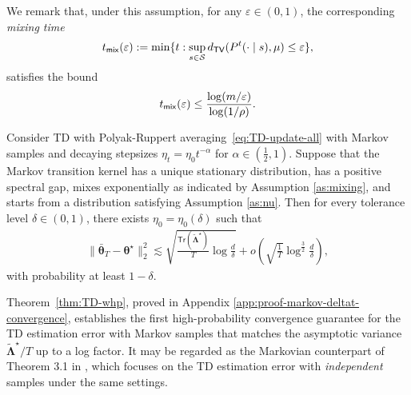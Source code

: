 \medskip
We remark that, under this assumption, for any $\varepsilon \in (0,1)$, the corresponding \emph{mixing time} 
\begin{align}\label{eq:defn-tmix}
t_{\mathsf{mix}}(\varepsilon):= \min\{t:\sup_{s \in \mathcal{S}}d_{\mathsf{TV}}(P^t(\cdot \mid s),\mu) \leq \varepsilon\},
\end{align}
satisfies the bound
\begin{align}\label{eq:tmix-bound}
t_{\mathsf{mix}}(\varepsilon) \leq \frac{ \log (m/\varepsilon)}{\log (1/\rho)}.
\end{align}

\medskip
\begin{customtheorem}\label{thm:TD-whp}
Consider TD with Polyak-Ruppert averaging~\eqref{eq:TD-update-all} with Markov samples and decaying stepsizes $\eta_t = \eta_0 t^{-\alpha}$ for $\alpha \in (\frac{1}{2},1)$. %
Suppose that the Markov transition kernel has a unique stationary distribution, has a positive spectral gap, mixes exponentially as indicated by Assumption \ref{as:mixing}, and starts from a distribution satisfying Assumption \ref{as:nu}. Then for every tolerance level $\delta \in (0,1)$, there exists $\eta_0 = \eta_0(\delta)$ such that
\begin{align*}
\|\bar{\bm{\theta}}_T-\bm{\theta}^\star\|_2^2 \lesssim \sqrt{\frac{\mathsf{Tr}(\tilde{\bm{\Lambda}}^\star)}{T}\log \frac{d}{\delta}} + o\left(\sqrt{\frac{1}{T}}\log^{\frac{3}{2}} \frac{d}{\delta}\right),
\end{align*}
with probability at least $1-\delta$.
\end{customtheorem}
\medskip

Theorem~\ref{thm:TD-whp}, proved in Appendix \ref{app:proof-markov-deltat-convergence}, establishes the first high-probability convergence guarantee for the TD estimation error with Markov samples that matches the asymptotic variance $\tilde{\bm{\Lambda}}^\star/T$ up to a log factor.  It may be regarded as the Markovian counterpart of Theorem 3.1 in \cite{wu2024statistical}, which focuses on the TD estimation error with \emph{independent} samples under the same settings. 

